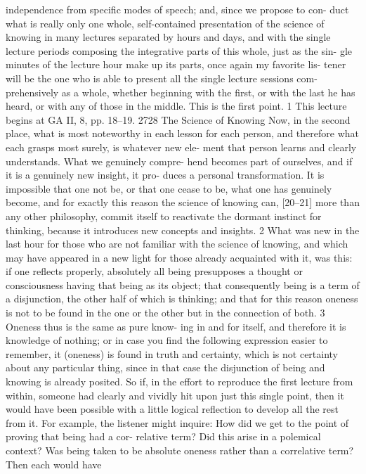 independence from specific modes of speech; and, since we propose to con-
duct what is really only one whole, self-contained presentation of the science
of knowing in many lectures separated by hours and days, and with the single
lecture periods composing the integrative parts of this whole, just as the sin-
gle minutes of the lecture hour make up its parts, once again my favorite lis-
tener will be the one who is able to present all the single lecture sessions com-
prehensively as a whole, whether beginning with the first, or with the last he
has heard, or with any of those in the middle. This is the first point. 1
This lecture begins at GA II, 8, pp. 18–19.
2728
The Science of Knowing
Now, in the second place, what is most noteworthy in each lesson for
each person, and therefore what each grasps most surely, is whatever new ele-
ment that person learns and clearly understands. What we genuinely compre-
hend becomes part of ourselves, and if it is a genuinely new insight, it pro-
duces a personal transformation. It is impossible that one not be, or that one
cease to be, what one has genuinely become, and for exactly this reason the
science of knowing can, [20–21] more than any other philosophy, commit
itself to reactivate the dormant instinct for thinking, because it introduces new
concepts and insights. 2
What was new in the last hour for those who are not familiar with the
science of knowing, and which may have appeared in a new light for those
already acquainted with it, was this: if one reflects properly, absolutely all
being presupposes a thought or consciousness having that being as its object;
that consequently being is a term of a disjunction, the other half of which is
thinking; and that for this reason oneness is not to be found in the one or the
other but in the connection of both. 3 Oneness thus is the same as pure know-
ing in and for itself, and therefore it is knowledge of nothing; or in case you
find the following expression easier to remember, it (oneness) is found in truth
and certainty, which is not certainty about any particular thing, since in that
case the disjunction of being and knowing is already posited. So if, in the
effort to reproduce the first lecture from within, someone had clearly and
vividly hit upon just this single point, then it would have been possible with a
little logical reflection to develop all the rest from it. For example, the listener
might inquire: How did we get to the point of proving that being had a cor-
relative term? Did this arise in a polemical context? Was being taken to be
absolute oneness rather than a correlative term? Then each would have
